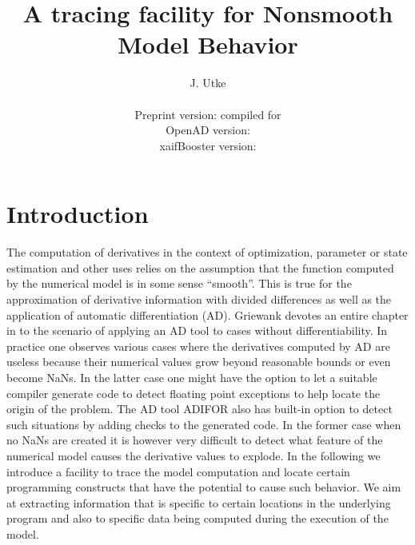 \documentclass{article}
\title{A tracing facility for Nonsmooth Model Behavior}
\author{J. Utke\\\\
        \small Preprint version:  compiled for \\
        \small OpenAD version: \\
        \small xaifBooster version: \\
}
\date{ }
\begin{document}
\maketitle
{}
\lstset{basicstyle=\footnotesize\tt, 
	numbers=left, 
	numberstyle=\scriptsize,
  	stepnumber=1, 
	numbersep=10pt, 
	breaklines=true,
	resetmargins=false,
	xleftmargin=6ex,
	columns=fullflexible}
\section{Introduction}

The computation of derivatives in the context of optimization, parameter or state estimation 
and other uses relies on the assumption that the function computed by the numerical 
model is in some sense ``smooth''. 
This is true for the approximation of derivative information with divided differences 
as well as the application of automatic differentiation (AD). 
Griewank devotes an entire chapter in \cite{Gri00} 
to the scenario of applying an AD tool to cases without differentiability. 
In practice one observes various cases where the derivatives computed by AD are useless 
because their numerical values grow  beyond reasonable bounds \cite{tfs-delayed,tfs-chain} or even 
become NaNs. 
In the latter case one might have the option to let a suitable compiler generate 
code to detect floating point exceptions to help locate the origin of the problem.
The AD  tool ADIFOR \cite{adiforWeb} also has built-in  option to detect 
such situations by adding checks to the generated code.   
In the former case when no NaNs are created it is however very difficult to 
detect what feature of the numerical model causes the derivative values to explode. 
In the following we introduce a facility to trace the model computation and locate 
certain programming constructs that have the potential to cause 
such behavior. We aim at extracting information that is specific to 
certain locations in the underlying program and also to specific data 
being computed during the execution of the model.  
   
\end{document}
